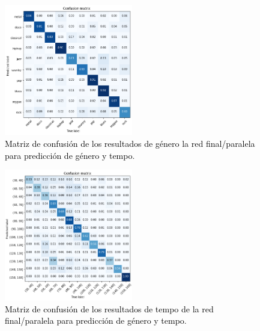 \begin{figure}[!ht]
  \centering
  \includegraphics[width=0.5\textwidth]{Figures/confusion_final_genero.png}
  \caption{\textcolor{black}{Matriz de confusión de los resultados de género la red final/paralela para predicción de género y tempo}.}
  \label{Fig:confusion_final_genero}
\end{figure}

\begin{figure}[!ht]
  \centering
  \includegraphics[width=0.5\textwidth]{Figures/confusion_final_tempo.png}
  \caption{\textcolor{black}{Matriz de confusión de los resultados de tempo de la red final/paralela para predicción de género y tempo}.}
  \label{Fig:confusion_final_tempo}
\end{figure}



